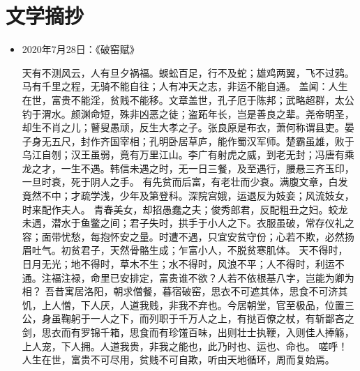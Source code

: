 \section{文学摘抄}
\begin{itemize}
\item 2020年7月28日：《破窑赋》

\begin{literbox}
    天有不测风云，人有旦夕祸福。蜈蚣百足，行不及蛇；雄鸡两翼，飞不过鸦。马有千里之程，无骑不能自往；人有冲天之志，非运不能自通。
    盖闻：人生在世，富贵不能淫，贫贱不能移。文章盖世，孔子厄于陈邦；武略超群，太公钓于渭水。颜渊命短，殊非凶恶之徒；盗跖年长，岂是善良之辈。尧帝明圣，却生不肖之儿；瞽叟愚顽，反生大孝之子。张良原是布衣，萧何称谓县吏。晏子身无五尺，封作齐国宰相；孔明卧居草庐，能作蜀汉军师。楚霸虽雄，败于乌江自刎；汉王虽弱，竟有万里江山。李广有射虎之威，到老无封；冯唐有乘龙之才，一生不遇。韩信未遇之时，无一日三餐，及至遇行，腰悬三齐玉印，一旦时衰，死于阴人之手。
    有先贫而后富，有老壮而少衰。满腹文章，白发竟然不中；才疏学浅，少年及第登科。深院宫娥，运退反为妓妾；风流妓女，时来配作夫人。
    青春美女，却招愚蠢之夫；俊秀郎君，反配粗丑之妇。蛟龙未遇，潜水于鱼鳖之间；君子失时，拱手于小人之下。衣服虽破，常存仪礼之容；面带忧愁，每抱怀安之量。时遭不遇，只宜安贫守份；心若不欺，必然扬眉吐气。初贫君子，天然骨骼生成；乍富小人，不脱贫寒肌体。
    天不得时，日月无光；地不得时，草木不生；水不得时，风浪不平；人不得时，利运不通。注福注禄，命里已安排定，富贵谁不欲？人若不依根基八字，岂能为卿为相？
    吾昔寓居洛阳，朝求僧餐，暮宿破窑，思衣不可遮其体，思食不可济其饥，上人憎，下人厌，人道我贱，非我不弃也。今居朝堂，官至极品，位置三公，身虽鞠躬于一人之下，而列职于千万人之上，有挞百僚之杖，有斩鄙吝之剑，思衣而有罗锦千箱，思食而有珍馐百味，出则壮士执鞭，入则佳人捧觞，上人宠，下人拥。人道我贵，非我之能也，此乃时也、运也、命也。
    嗟呼！人生在世，富贵不可尽用，贫贱不可自欺，听由天地循环，周而复始焉。
\end{literbox}

\end{itemize}
